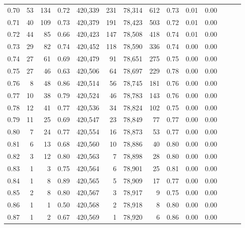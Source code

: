 \begin{tabular}{rrrrrrrrrrrrrr}
0.70 &      53 &    134 &  0.72 &  420,339 &      231 &  78,314 &     612 &  0.73 &  0.01 &      0.00 \\
0.71 &      40 &    109 &  0.73 &  420,379 &      191 &  78,423 &     503 &  0.72 &  0.01 &      0.00 \\
0.72 &      44 &     85 &  0.66 &  420,423 &      147 &  78,508 &     418 &  0.74 &  0.01 &      0.00 \\
0.73 &      29 &     82 &  0.74 &  420,452 &      118 &  78,590 &     336 &  0.74 &  0.00 &      0.00 \\
0.74 &      27 &     61 &  0.69 &  420,479 &       91 &  78,651 &     275 &  0.75 &  0.00 &      0.00 \\
0.75 &      27 &     46 &  0.63 &  420,506 &       64 &  78,697 &     229 &  0.78 &  0.00 &      0.00 \\
0.76 &       8 &     48 &  0.86 &  420,514 &       56 &  78,745 &     181 &  0.76 &  0.00 &      0.00 \\
0.77 &      10 &     38 &  0.79 &  420,524 &       46 &  78,783 &     143 &  0.76 &  0.00 &      0.00 \\
0.78 &      12 &     41 &  0.77 &  420,536 &       34 &  78,824 &     102 &  0.75 &  0.00 &      0.00 \\
0.79 &      11 &     25 &  0.69 &  420,547 &       23 &  78,849 &      77 &  0.77 &  0.00 &      0.00 \\
0.80 &       7 &     24 &  0.77 &  420,554 &       16 &  78,873 &      53 &  0.77 &  0.00 &      0.00 \\
0.81 &       6 &     13 &  0.68 &  420,560 &       10 &  78,886 &      40 &  0.80 &  0.00 &      0.00 \\
0.82 &       3 &     12 &  0.80 &  420,563 &        7 &  78,898 &      28 &  0.80 &  0.00 &      0.00 \\
0.83 &       1 &      3 &  0.75 &  420,564 &        6 &  78,901 &      25 &  0.81 &  0.00 &      0.00 \\
0.84 &       1 &      8 &  0.89 &  420,565 &        5 &  78,909 &      17 &  0.77 &  0.00 &      0.00 \\
0.85 &       2 &      8 &  0.80 &  420,567 &        3 &  78,917 &       9 &  0.75 &  0.00 &      0.00 \\
0.86 &       1 &      1 &  0.50 &  420,568 &        2 &  78,918 &       8 &  0.80 &  0.00 &      0.00 \\
0.87 &       1 &      2 &  0.67 &  420,569 &        1 &  78,920 &       6 &  0.86 &  0.00 &      0.00 \\

\end{tabular}
